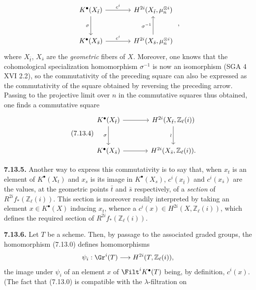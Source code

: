 %

\[
\begin{tikzcd}[column sep=large,row sep=large]
K^\bullet(X_{\bar t}) \arrow[r,"c^i"] \arrow[d,"\sigma"'] &
H^{2i}(X_{\bar t},\mu_n^{\otimes i})\\
K^\bullet(X_{\bar s}) \arrow[r,"c^i"] &
H^{2i}(X_{\bar s},\mu_n^{\otimes i}) \arrow[u,"\sigma^{-1}"]
\end{tikzcd}
\;,
\]
where \(X_{\bar t}\), \(X_{\bar s}\) are the \emph{geometric} fibers of \(X\). Moreover, one knows that the cohomological specialization homomorphism \(\sigma^{-1}\) is now an isomorphism (SGA 4 XVI 2.2), so the commutativity of the preceding square can also be expressed as the commutativity of the square obtained by reversing the preceding arrow. Passing to the projective limit over \(n\) in the commutative squares thus obtained, one finds a commutative square
\begin{equation}\tag{7.13.4}
\begin{tikzcd}[column sep=large,row sep=large]
K^\bullet(X_{\bar t}) \arrow[r] \arrow[d,"\sigma"'] &
H^{2i}(X_{\bar t},\mathbb Z_\ell(i)) \arrow[d,"\wr"']\\
K^\bullet(X_{\bar s}) \arrow[r] &
H^{2i}(X_{\bar s},\mathbb Z_\ell(i)).
\end{tikzcd}
\end{equation}

\textbf{7.13.5.} Another way to express this commutativity is to say that, when \(x_t\) is an element of \(K^\bullet(X_t)\) and \(x_s\) is its image in \(K^\bullet(X_s)\), \(c^i(x_{\bar t})\) and \(c^i(x_{\bar s})\) are the values, at the geometric points \(\bar t\) and \(\bar s\) respectively, of a \emph{section} of \(R^{2i}f_*(\mathbb Z_\ell(i))\). This section is moreover readily interpreted by taking an element \(x\in K^\bullet(X)\) inducing \(x_t\), whence a \(c^i(x)\in H^{2i}(X,\mathbb Z_\ell(i))\), which defines the required section of \(R^{2i}f_*(\mathbb Z_\ell(i))\).

\textbf{7.13.6.} Let \(T\) be a scheme. Then, by passage to the associated graded groups, the homomorphism (7.13.0) defines homomorphisms
\[
  \psi_i:\Gr^i(T)\longrightarrow H^{2i}(T,\mathbb Z_\ell(i)),
\]
the image under \(\psi_i\) of an element \(x\) of \(\Filt^iK^\bullet(T)\) being, by definition, \(c^i(x)\). (The fact that (7.13.0) is compatible with the \(\lambda\)-filtration on
